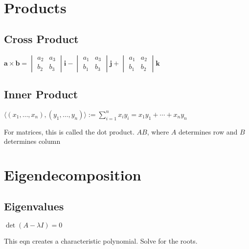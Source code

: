 \documentclass[10pt,letterpaper]{article}
\newenvironment{tight_item}
{\begin{itemize}
\setlength{\parskip}{0pt}
\setlength{\parsep}{0pt}
\setlength{\itemsep}{0pt}
\setlength{\parsep}{0pt}
\setlength{\topsep}{0pt}
\setlength{\partopsep}{0pt}
\setlength{\leftmargin}{0em}
\setlength{\labelwidth}{0em}
\setlength{\labelsep}{0em} }
{\end{itemize}}
\newenvironment{tight_enum}
{\begin{enumerate}
\setlength{\parskip}{0pt}
\setlength{\parsep}{0pt}
\setlength{\itemsep}{0pt}
\setlength{\parsep}{0pt}
\setlength{\topsep}{0pt}
\setlength{\partopsep}{0pt}
\setlength{\leftmargin}{0em}
\setlength{\labelwidth}{0em}
\setlength{\labelsep}{0em} }
{\end{enumerate}}
\begin{document}
{\begin{multicols*}{5}
\section{Products}
\subsection{Cross Product}
\begin{center}
\begin{math}
\mathbf{a}\times\mathbf{b}=
\begin{vmatrix}
a_2 & a_3\\
b_2 & b_3
\end{vmatrix} \mathbf{i} - 
\begin{vmatrix}
a_1 & a_3\\
b_1 & b_3
\end{vmatrix} \mathbf{j}+
\begin{vmatrix}
a_1 & a_2\\
b_1 & b_2
\end{vmatrix} \mathbf{k}
\end{math}
\end{center}
\subsection{Inner Product}
\begin{center}
$\langle (x_1,\ldots, x_n),(y_1,\ldots, y_n)\rangle := \sum_{i=1}^{n} x_i y_i =
x_1 y_1 + \cdots + x_n y_n$
\end{center}
\begin{tight_item}
\item For matrices, this is called the dot product. $AB$, where $A$ determines row
and $B$ determines column
\end{tight_item}


\section{Eigendecomposition}

\subsection{Eigenvalues}
\begin{center}
$\det{(A - \lambda I)}=0$
\end{center}
\begin{tight_enum}
\item This eqn creates a characteristic polynomial. Solve for the roots.
\end{tight_enum}


\end{multicols*}}
\end{document}
